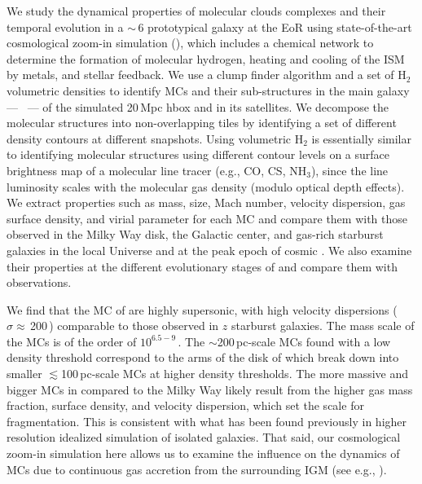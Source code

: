\IfFileExists{emulateapjlegacy.cls}{\documentclass[iop]{emulateapjlegacy}}{\documentclass[iop]{emulateapj}}
\begin{document}
We study the dynamical properties of molecular clouds complexes and their temporal evolution in a \z$\sim$\,6 prototypical galaxy 
at the EoR using state-of-the-art cosmological zoom-in simulation (),
which includes a chemical network to determine the formation of molecular
hydrogen, heating and cooling of the ISM by metals, and stellar feedback.
We use a clump finder algorithm and a set of H$_2$ volumetric densities
to identify MCs and their sub-structures in the main galaxy --- \flower\ --- of the
simulated 20\,Mpc h\pmOne box and in its satellites.
We decompose the molecular structures into non-overlapping tiles
by identifying a set of different density contours at different snapshots.
Using volumetric H$_2$ is essentially similar to identifying molecular structures using
different contour levels on a surface brightness map of a molecular line tracer (e.g., CO, CS, NH$_3$),
since the line luminosity scales with the molecular gas density (modulo optical depth effects).
We extract properties such as mass, size, Mach number, velocity dispersion, gas surface density, and virial parameter for each MC and 
compare them with those observed in the Milky Way disk, the Galactic center,
and gas-rich starburst galaxies in the local Universe and at the peak epoch of cosmic \SF.
We also examine their properties at the different evolutionary stages of \flower and compare
them with observations. 

We find that the MC of \flower are highly supersonic, with high velocity dispersions ($\sigma\approx$\,200\,\kms) comparable to 
those observed in $z$ starburst galaxies.
The mass scale of the MCs is of the order of $10^{6.5-9}$\,\Msun. The $\sim$200\,pc-scale MCs found with a low density threshold 
correspond to the arms of the disk of \flower which break down into smaller $\lesssim$100\,pc-scale MCs at higher density thresholds. 
The more massive and bigger MCs in \flower compared to the Milky Way 
likely result from the higher gas mass fraction, surface density, and velocity dispersion, 
which set the scale for fragmentation.
This is consistent with what has been found previously in higher resolution idealized simulation of isolated galaxies.
That said, our cosmological zoom-in simulation here allows us to examine 
the influence on the dynamics of MCs due to continuous gas accretion from the surrounding IGM (see e.g., \citealt{Klessen10a, Goldbaum11a}).
\end{document}
